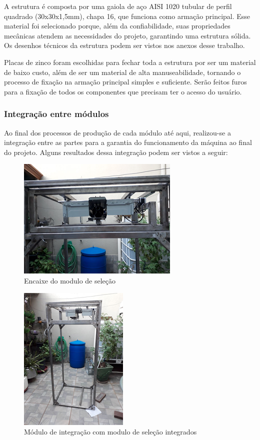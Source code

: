 A estrutura é composta por uma gaiola de aço AISI 1020 tubular de perfil quadrado (30x30x1,5mm), chapa 16, que funciona como armação  principal. Esse material foi selecionado porque, além da confiabilidade, suas propriedades mecânicas atendem as necessidades do projeto, garantindo uma estrutura sólida. Os desenhos técnicos da estrutura podem ser vistos nos anexos desse trabalho. 

Placas de zinco foram escolhidas para fechar toda a estrutura por ser um material de baixo custo, além de ser um material de alta manuseabilidade, tornando o processo de fixação na armação principal simples e suficiente. Serão feitos furos para a fixação de todos os componentes que precisam ter o acesso do usuário. 

\subsubsection{Integração entre módulos}
Ao final dos processos de produção de cada módulo até aqui, realizou-se a integração entre as partes para a garantia do funcionamento da máquina ao final do projeto. Alguns resultados dessa integração podem ser vistos a seguir:

\begin{figure}[!h]
	\centering
		\includegraphics[scale=0.4]{figuras/estrutura/31.png}
	\caption{Encaixe do modulo de seleção}
\end{figure}

\begin{figure}[!h]
	\centering
		\includegraphics[scale=0.4]{figuras/estrutura/32.png}
	\caption{Módulo de integração com modulo de seleção integrados}
\end{figure}

